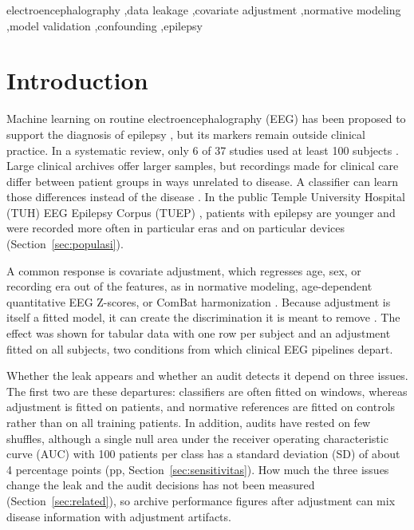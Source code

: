 \documentclass[final,1p,times]{elsarticle}
\begin{document}
\begin{frontmatter}
\begin{keyword}
electroencephalography \sep data leakage \sep covariate adjustment \sep normative modeling \sep model validation \sep confounding \sep epilepsy
\end{keyword}%

\end{frontmatter}

\section{Introduction}\label{sec:intro}

Machine learning on routine electroencephalography (EEG) has been proposed to support the diagnosis of epilepsy \cite{sunaryono2022,sunaryono2023}, but its markers remain outside clinical practice. In a systematic review, only 6 of 37 studies used at least 100 subjects \cite{lemoine2024}. Large clinical archives offer larger samples, but recordings made for clinical care differ between patient groups in ways unrelated to disease. A classifier can learn those differences instead of the disease \cite{ongly2024}. In the public Temple University Hospital (TUH) EEG Epilepsy Corpus (TUEP) \cite{obeid2016,veloso2017}, patients with epilepsy are younger and were recorded more often in particular eras and on particular devices (Section~\ref{sec:populasi}).

A common response is covariate adjustment, which regresses age, sex, or recording era out of the features, as in normative modeling, age-dependent quantitative EEG Z-scores, or ComBat harmonization \cite{marquand2016,rutherford2022,li2022harmnqeeg,jaramillojimenez2024}. Because adjustment is itself a fitted model, it can create the discrimination it is meant to remove \cite{hamdan2023}. The effect was shown for tabular data with one row per subject and an adjustment fitted on all subjects, two conditions from which clinical EEG pipelines depart.

Whether the leak appears and whether an audit detects it depend on three issues. The first two are these departures: classifiers are often fitted on windows, whereas adjustment is fitted on patients, and normative references are fitted on controls rather than on all training patients. In addition, audits have rested on few shuffles, although a single null area under the receiver operating characteristic curve (AUC) with 100 patients per class has a standard deviation (SD) of about 4 percentage points (pp, Section~\ref{sec:sensitivitas}). How much the three issues change the leak and the audit decisions has not been measured (Section~\ref{sec:related}), so archive performance figures after adjustment can mix disease information with adjustment artifacts.
\end{document}
